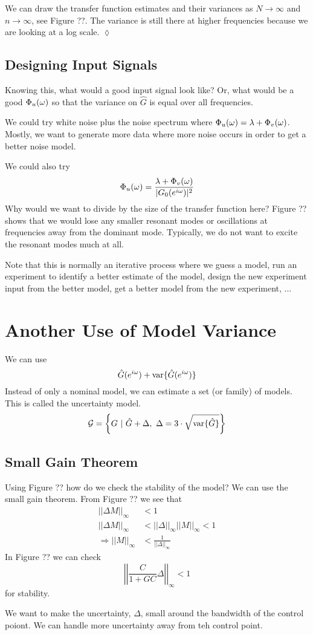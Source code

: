 \begin{example}
We can draw the transfer function estimates and their variances as $N\to\infty$ and $n\to\infty$, see Figure ??. The variance is still there at higher frequencies because we are looking at a log scale.
$\lozenge$
\end{example}

\subsection{Designing Input Signals}
Knowing this, what would a good input signal look like? Or, what would be a good $\Phi_u(\omega)$ so that the variance on $\hat{G}$ is equal over all frequencies.

We could try white noise plus the noise spectrum where $\Phi_u(\omega)=\lambda+\Phi_v(\omega)$. Mostly, we want to generate more data where more noise occurs in order to get a better noise model.

We could also try
$$\Phi_u(\omega) = \frac{\lambda+\Phi_v(\omega)}{|G_0(e^{i\omega})|^2}$$
Why would we want to divide by the size of the transfer function here? Figure ?? shows that we would lose any smaller resonant modes or oscillations at frequencies away from the dominant mode. Typically, we do not want to excite the resonant modes much at all.

Note that this is normally an iterative process where we guess a model, run an experiment to identify a better estimate of the model, design the new experiment input from the better model, get a better model from the new experiment, ...

\section{Another Use of Model Variance}
We can use
$$\hat{G}(e^{i\omega}) + \text{var}\{\hat{G}(e^{i\omega})\}$$
Instead of only a nominal model, we can estimate a set (or family) of models. This is called the uncertainty model.
$$\mathcal{G} = \left\lbrace G ~|~ \hat{G}+\Delta, ~\Delta=3\cdot\sqrt{\text{var}\{\hat{G}\}}\right\rbrace$$

\subsection{Small Gain Theorem}
Using Figure ?? how do we check the stability of the model? We can use the small gain theorem. From Figure ?? we see that
\begin{align*}
||\Delta M||_\infty &< 1 \\
||\Delta M||_\infty &< ||\Delta||_\infty||M||_\infty < 1 \\
\Rightarrow ||M||_\infty &< \frac{1}{||\Delta||_\infty}
\end{align*}
In Figure ?? we can check
$$\left|\left|\frac{C}{1+GC}\Delta\right|\right|_\infty < 1$$
for stability.

We want to make the uncertainty, $\Delta$, small around the bandwidth of the control poiont. We can handle more uncertainty away from teh control point.

